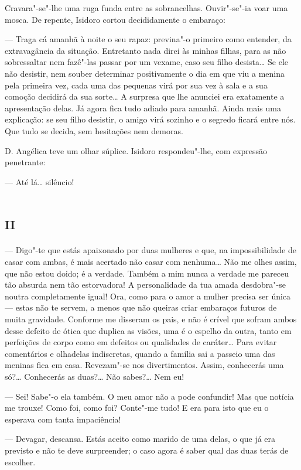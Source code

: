 Cravara"-se"-lhe uma ruga funda entre as sobrancelhas. Ouvir"-se"-ia voar
uma mosca. De repente, Isidoro cortou decididamente o embaraço:

--- Traga cá amanhã à noite o seu rapaz: previna"-o primeiro como
entender, da extravagância da situação. Entretanto nada direi às minhas
filhas, para as não sobressaltar nem fazê"-las passar por um vexame, caso
seu filho desista\ldots{} Se ele não desistir, nem souber determinar
positivamente o dia em que viu a menina pela primeira vez, cada uma das
pequenas virá por sua vez à sala e a sua comoção decidirá da sua
sorte\ldots{} A surpresa que lhe anunciei era exatamente a apresentação
delas. Já agora fica tudo adiado para amanhã. Ainda mais uma explicação:
se seu filho desistir, o amigo virá sozinho e o segredo ficará entre
nós. Que tudo se decida, sem hesitações nem demoras.

D. Angélica teve um olhar súplice. Isidoro respondeu"-lhe, com expressão
penetrante:

--- Até lá\ldots{} silêncio!

\section{\textsc{ii}}

--- Digo"-te que estás apaixonado por duas mulheres e que, na
impossibilidade de casar com ambas, é mais acertado não casar com
nenhuma\ldots{} Não me olhes assim, que não estou doido; é a verdade. Também
a mim nunca a verdade me pareceu tão absurda nem tão estorvadora! A
personalidade da tua amada desdobra"-se noutra completamente igual! Ora,
como para o amor a mulher precisa ser única --- estas não te servem, a
menos que não queiras criar embaraços futuros de muita gravidade.
Conforme me disseram os pais, e não é crível que sofram ambos desse
defeito de ótica que duplica as visões, uma é o espelho da outra, tanto
em perfeições de corpo como em defeitos ou qualidades de caráter\ldots{} Para
evitar comentários e olhadelas indiscretas, quando a família sai a
passeio uma das meninas fica em casa. Revezam"-se nos divertimentos.
Assim, conhecerás uma só?\ldots{} Conhecerás as duas?\ldots{} Não sabes?\ldots{} Nem
eu!

--- Sei! Sabe"-o ela também. O meu amor não a pode confundir! Mas que
notícia me trouxe! Como foi, como foi? Conte"-me tudo! E era para isto
que eu o esperava com tanta impaciência!

--- Devagar, descansa. Estás aceito como marido de uma delas, o que já
era previsto e não te deve surpreender; o caso agora é saber qual das
duas terás de escolher.

